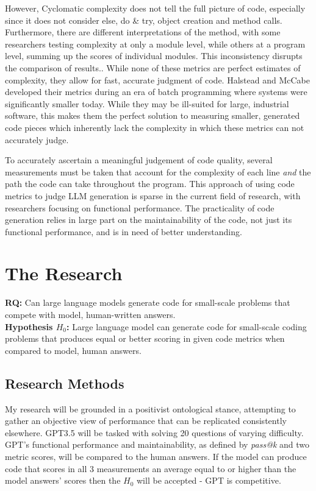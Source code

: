 \documentclass[manuscript,screen,review,sigconf]{acmart}
\begin{document}
However, Cyclomatic complexity does not tell the full picture of code, especially since it does not consider else, do \& try, object creation and method calls. Furthermore, there are different interpretations of the method, with some researchers testing complexity at only a module level, while others at a program level, summing up the scores of individual modules. This inconsistency disrupts the comparison of results.\cite{McCabeCritique, NoviceCodeWriting}.  While none of these metrics are perfect estimates of complexity, they allow for fast, accurate judgment of code. Halstead and McCabe developed their metrics during an era of batch programming where systems were significantly smaller today. While they may be ill-suited for large, industrial software, this makes them the perfect solution to measuring smaller, generated code pieces which inherently lack the complexity in which these metrics can not accurately judge\cite{metricCritique}.

To accurately ascertain a meaningful judgement of code quality, several measurements must be taken that account for the complexity of each line \textit{and} the path the code can take throughout the program. This approach of using code metrics to judge LLM generation is sparse in the current field of research\cite{CopilotPairProgrammer, CopilotSuggestionsEval}, with researchers focusing on functional performance. The practicality of code generation relies in large part on the maintainability of the code, not just its functional performance, and is in need of better understanding.

\section{The Research}
\textbf{RQ:} Can large language models generate code for small-scale problems that compete with model, human-written answers.\\
\textbf{Hypothesis \(H_0\):} Large language model can generate code for small-scale coding problems that produces equal or better scoring in given code metrics when compared to model, human answers.

\subsection{Research Methods}
My research will be grounded in a positivist ontological stance, attempting to gather an objective view of performance that can be replicated consistently elsewhere. GPT3.5 will be tasked with solving 20 questions of varying difficulty. GPT's functional performance and maintainability, as defined by \textit{pass@k} and two metric scores, will be compared to the human answers. If the model can produce code that scores in all 3 measurements an average equal to or higher than the model answers' scores then the \(H_0\) will be accepted - GPT is competitive.
\end{document}
